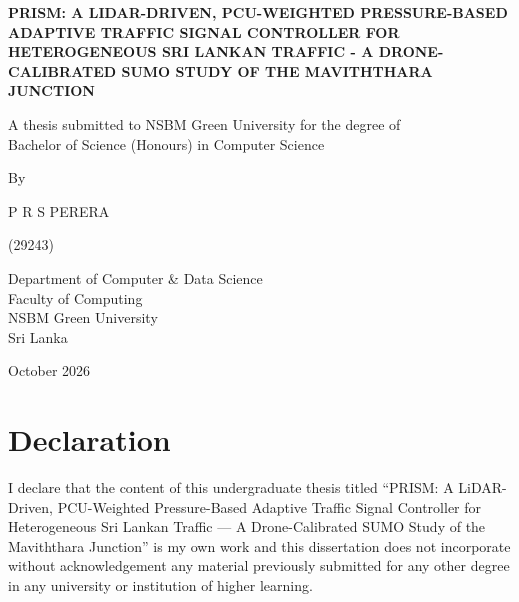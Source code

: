 
\begin{titlepage}
\thispagestyle{empty}
\begin{center}
\onehalfspacing
\vspace*{0.2cm}
{\fontsize{16}{24}\selectfont\bfseries PRISM: A LIDAR-DRIVEN, PCU-WEIGHTED PRESSURE-BASED ADAPTIVE TRAFFIC SIGNAL CONTROLLER FOR HETEROGENEOUS SRI LANKAN TRAFFIC - A DRONE-CALIBRATED SUMO STUDY OF THE MAVITHTHARA JUNCTION\par}

\vspace{1.4cm}
{\fontsize{14}{21}\selectfont
A thesis submitted to NSBM Green University for the degree of\\
Bachelor of Science (Honours) in Computer Science\par
\vspace{1.0cm}
By\par
\vspace{1.0cm}
P R S PERERA\par
(29243)\par
\vspace{1.4cm}
Department of Computer \& Data Science\\
Faculty of Computing\\
NSBM Green University\\
Sri Lanka\par
\vspace{1.0cm}
October 2026\par}
\end{center}
\end{titlepage}
\setcounter{page}{2}

\chapter*{Declaration}

I declare that the content of this undergraduate thesis titled ``PRISM: A LiDAR-Driven, PCU-Weighted Pressure-Based Adaptive Traffic Signal Controller for Heterogeneous Sri Lankan Traffic --- A Drone-Calibrated SUMO Study of the Maviththara Junction'' is my own work and this dissertation does not incorporate without acknowledgement any material previously submitted for any other degree in any university or institution of higher learning.

